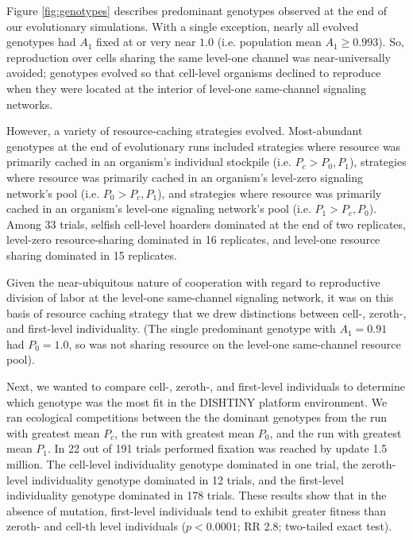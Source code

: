 Figure \ref{fig:genotypes} describes predominant genotypes observed at the end of our evolutionary simulations.
With a single exception, nearly all evolved genotypes had $A_1$ fixed at or very near $1.0$ (i.e. population mean $A_1 \geq 0.993$).
So, reproduction over cells sharing the same level-one channel was near-universally avoided;
genotypes evolved so that cell-level organisms declined to reproduce when they were located at the interior of level-one same-channel signaling networks.

However, a variety of resource-caching strategies evolved.
Most-abundant genotypes at the end of evolutionary runs included strategies where resource was primarily cached in an organism's individual stockpile (i.e. $P_{c} > P_0, P_1$), strategies where resource was primarily cached in an organism's level-zero signaling network's pool (i.e. $P_0 > P_{c}, P_1$), and strategies where resource was primarily cached in an organism's level-one signaling network's pool (i.e. $P_1 > P_{c}, P_0$).
Among 33 trials, selfish cell-level hoarders dominated at the end of two replicates, level-zero resource-sharing dominated in 16 replicates, and level-one resource sharing dominated in 15 replicates.

Given the near-ubiquitous nature of cooperation with regard to reproductive division of labor at the level-one same-channel signaling network, it was on this basis of resource caching strategy that we drew distinctions between cell-, zeroth-, and first-level individuality.
(The single predominant genotype with $A_1 = 0.91$ had $P_0 = 1.0$, so was not sharing resource on the level-one same-channel resource pool).

Next, we wanted to compare cell-, zeroth-, and first-level individuals to determine which genotype was the most fit in the DISHTINY platform environment.
We ran ecological competitions between the the dominant genotypes from the run with greatest mean $P_{c}$, the run with greatest mean $P_0$, and the run with greatest mean $P_1$.
In 22 out of 191 trials performed fixation was reached by update 1.5 million.  The cell-level individuality genotype dominated in one trial, the zeroth-level individuality genotype dominated in 12 trials, and the first-level individuality genotype dominated in 178 trials.
These results show that in the absence of mutation, first-level individuals tend to exhibit greater fitness than zeroth- and cell-th level individuals ($p < 0.0001$; RR 2.8; two-tailed exact test).

